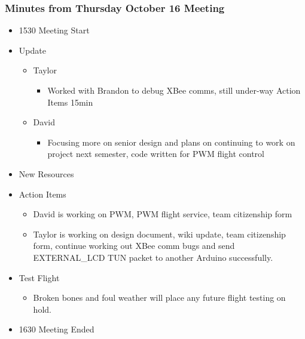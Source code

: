 \documentclass[pdftex,11pt]{article}
\begin{document}
\subsubsection[short]{Minutes from Thursday October 16 Meeting}
\begin{itemize}
	\item 1530 \indent Meeting Start
	\item Update
	\begin{itemize}
		\item Taylor
		\begin{itemize}
			\item Worked with Brandon to debug XBee comms, still under-way Action Items 15min
		\end{itemize}
		\item David
		\begin{itemize}
			\item  Focusing more on senior design and plans on continuing to work on project next semester, code written for PWM flight control
		\end{itemize}
	\end{itemize}
	\item New Resources
		\begin{itemize}

		\end{itemize}
	\item Action Items
	\begin{itemize}
		\item David is working on PWM, PWM flight service, team citizenship form
		\item Taylor is working on design document, wiki update, team citizenship form, continue working out XBee comm bugs and send EXTERNAL_LCD TUN packet to another Arduino successfully.
	\end{itemize}
	\item Test Flight
	\begin{itemize}
		\item  Broken bones and foul weather will place any future flight testing on hold.
	\end{itemize}
	\item 1630 \indent Meeting Ended
\end{itemize}	


\clearpage

\clearpage
\appendix
\appendixpage	
\addappheadtotoc
\end{document}
